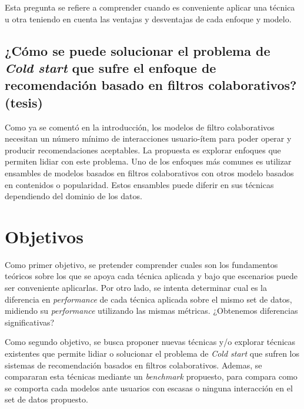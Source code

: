 \documentclass[11pt,a4paper,twoside]{thesis}
\begin{document}
Esta pregunta se refiere a comprender cuando es conveniente aplicar una técnica
u otra teniendo en cuenta las ventajas y desventajas de cada enfoque y modelo.

\subsection{¿Cómo se puede solucionar el problema de \textit{Cold start}
	que sufre el enfoque de recomendación basado en filtros colaborativos? (tesis)}

Como ya se comentó en la introducción, los modelos de filtro colaborativos
necesitan un número mínimo de interacciones usuario-ítem para poder operar y
producir recomendaciones aceptables. La propuesta es explorar enfoques que
permiten lidiar con este problema. Uno de los enfoques más comunes es utilizar
ensambles de modelos basados en filtros colaborativos con otros modelo basados
en contenidos o popularidad. Estos ensambles puede diferir en sus técnicas
dependiendo del dominio de los datos.

\section{Objetivos}

Como primer objetivo, se pretender comprender cuales son los fundamentos
teóricos sobre los que se apoya cada técnica aplicada y bajo que escenarios
puede ser conveniente aplicarlas. Por otro lado, se intenta determinar cual es
la diferencia en \textit{performance} de cada técnica aplicada sobre el mismo
set de datos, midiendo su \textit{performance} utilizando las mismas métricas.
¿Obtenemos diferencias significativas?

Como segundo objetivo, se busca proponer nuevas técnicas y/o explorar técnicas
existentes que permite lidiar o solucionar el problema de \textit{Cold start}
que sufren los sistemas de recomendación basados en filtros colaborativos.
Ademas, se compararan esta técnicas mediante un \textit{benchmark} propuesto,
para compara como se comporta cada modelos ante usuarios con escasas o ninguna
interacción en el set de datos propuesto.



\renewcommand{\bibname}{Referencias}
\end{document}
